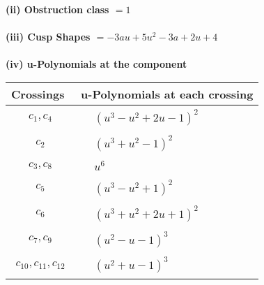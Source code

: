 \documentclass[1p]{elsarticle_modified}
\theoremstyle{definition}
\begin{document}
\flushleft \textbf{(ii) Obstruction class $= 1$}\\~\\
\flushleft \textbf{(iii) Cusp Shapes $= -3 a u+5 u^2-3 a+2 u+4$}\\~\\
\newpage\renewcommand{\arraystretch}{1}
\flushleft \textbf{(iv) u-Polynomials at the component}\newline \\
\begin{tabular}{m{50pt}|m{274pt}}
Crossings & \hspace{64pt}u-Polynomials at each crossing \\
\hline $$\begin{aligned}c_{1},c_{4}\end{aligned}$$&$\begin{aligned}
&(u^3- u^2+2 u-1)^2
\end{aligned}$\\
\hline $$\begin{aligned}c_{2}\end{aligned}$$&$\begin{aligned}
&(u^3+u^2-1)^2
\end{aligned}$\\
\hline $$\begin{aligned}c_{3},c_{8}\end{aligned}$$&$\begin{aligned}
&u^6
\end{aligned}$\\
\hline $$\begin{aligned}c_{5}\end{aligned}$$&$\begin{aligned}
&(u^3- u^2+1)^2
\end{aligned}$\\
\hline $$\begin{aligned}c_{6}\end{aligned}$$&$\begin{aligned}
&(u^3+u^2+2 u+1)^2
\end{aligned}$\\
\hline $$\begin{aligned}c_{7},c_{9}\end{aligned}$$&$\begin{aligned}
&(u^2- u-1)^3
\end{aligned}$\\
\hline $$\begin{aligned}c_{10},c_{11},c_{12}\end{aligned}$$&$\begin{aligned}
&(u^2+u-1)^3
\end{aligned}$\\
\hline
\end{tabular}\\~\\
\end{document}
